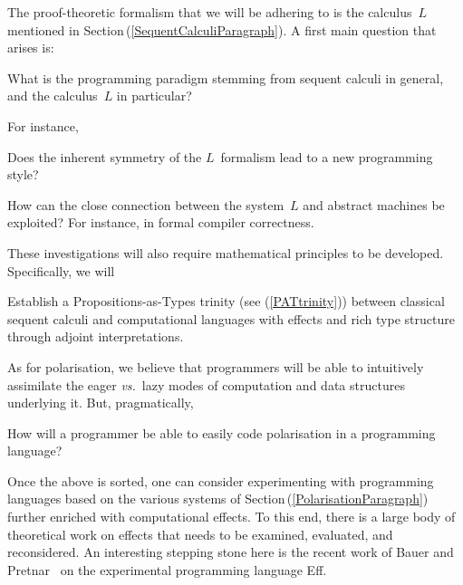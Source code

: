 \documentclass[11pt,twocolumn]{article}
\newcounter{CC}
\newenvironment{resenumerate}
  {\begin{list}{[\textbf{\arabic{CC}]}}
  {\usecounter{CC}
   \setlength{\topsep}{2pt}
   \setlength{\partopsep}{2pt}
   \setlength{\itemsep}{2.5pt}
   \setlength{\parsep}{2.5pt}
   \setlength{\leftmargin}{1.65em}
   \setlength{\labelwidth}{1.15em}
 }}
  {\end{list}}
\newcommand{\pref}[1]{\,(\ref{#1})}
\newcommand{\vs}{\emph{vs.}}
\newcommand{\SysL}{$L$}%
\begin{document}
The proof-theoretic formalism that we will be adhering to is the
calculus~{\SysL} mentioned in Section\pref{SequentCalculiParagraph}.  A first
main question that arises is:
\begin{resenumerate}\setcounter{CC}{0}
\item 
  What is the programming paradigm stemming from sequent calculi in
  general, and the calculus~{\SysL} in particular?
\end{resenumerate}
For instance, 
\begin{resenumerate}\setcounter{CC}{1}
\item
  Does the inherent symmetry of the {\SysL}~formalism lead to a new programming
  style?

\item
  How can the close connection between the system~{\SysL} and abstract
  machines be exploited?  For instance, in formal compiler correctness.
\end{resenumerate}
These investigations will also require mathematical principles to be
developed.  Specifically, we will 
\begin{resenumerate}\setcounter{CC}{3}
\item
  Establish a Propositions-as-Types 
  trinity (see (\ref{PATtrinity})) between classical sequent calculi and
  computational languages with effects and rich type structure through
  adjoint interpretations.
\end{resenumerate}

As for polarisation, we believe that programmers will be able to intuitively
assimilate the eager {\vs}~lazy modes of computation and data structures
underlying it.  But, pragmatically,
\begin{resenumerate}\setcounter{CC}{4}
\item
  How will a programmer be able to easily code polarisation in a
  programming language?
\end{resenumerate}

Once the above is sorted, one can consider experimenting with programming
languages based on the various systems of
Section\pref{PolarisationParagraph} further enriched with computational
effects.  To this end, there is a large body of theoretical work on
effects that needs to be examined, evaluated, and reconsidered.  An
interesting stepping stone here is the recent work of Bauer and
Pretnar~\cite{BauerPretnar} on the experimental programming language Eff.  
\end{document}
